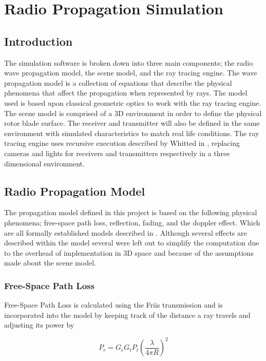 \chapter{Radio Propagation Simulation} \label{ch:radio_propagation}

\section{Introduction}
The simulation software is broken down into three main components; the radio wave propagation model, the scene model, and the ray tracing engine. The wave propagation model is a collection of equations that describe the physical phenomena that affect the propagation when represented by rays. The model used is based upon classical geometric optics to work with the ray tracing engine. The scene model is comprised of a 3D environment in order to define the physical rotor blade surface. The receiver and transmitter will also be defined in the same environment with simulated characteristics to match real life conditions. The ray tracing engine uses recursive execution described by Whitted in \cite{Whitted1979}, replacing cameras and lights for receivers and transmitters respectively in a three dimensional environment.

\section{Radio Propagation Model}
The propagation model defined in this project is based on the following physical phenomena; free-space path loss, reflection, fading, and the doppler effect. Which are all formally established models described in \cite{Bertoni1999, Parsons2000, Willis2005}. Although several effects are described within the model several were left out to simplify the computation due to the overhead of implementation in 3D space and because of the assumptions made about the scene model.

\subsection{Free-Space Path Loss}
Free-Space Path Loss is calculated using the Friis transmission and is incorporated into the model by keeping track of the distance a ray travels and adjusting its power by

\begin{equation}
	 P_r = G_r G_t P_t \left (\frac{\lambda}{4\pi R}\right)^2
	 \label{eqn:FSPL}
\end{equation}

